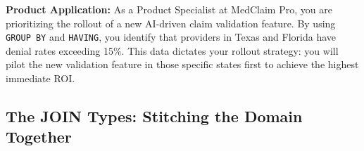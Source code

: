 \begin{Shaded}
\begin{Highlighting}[]
    \NormalTok{(} \OperatorTok{=}      \NormalTok{) }
\NormalTok{    (}\NormalTok{(} \OperatorTok{=}      \NormalTok{) }\OperatorTok{*}  \OperatorTok{/} 
\OperatorTok{\textgreater{}=} 
 
\NormalTok{ (}\NormalTok{(} \OperatorTok{=}      \NormalTok{) }\OperatorTok{*}  \OperatorTok{/} \OperatorTok{\textgreater{}} 
 \NormalTok{;}
\end{Highlighting}
\end{Shaded}

\textbf{Product Application:} As a Product Specialist at MedClaim Pro,
you are prioritizing the rollout of a new AI-driven claim validation
feature. By using \texttt{GROUP\ BY} and \texttt{HAVING}, you identify
that providers in Texas and Florida have denial rates exceeding 15\%.
This data dictates your rollout strategy: you will pilot the new
validation feature in those specific states first to achieve the highest
immediate ROI.

\subsection{The JOIN Types: Stitching the Domain
Together}\label{the-join-types-stitching-the-domain-together}

